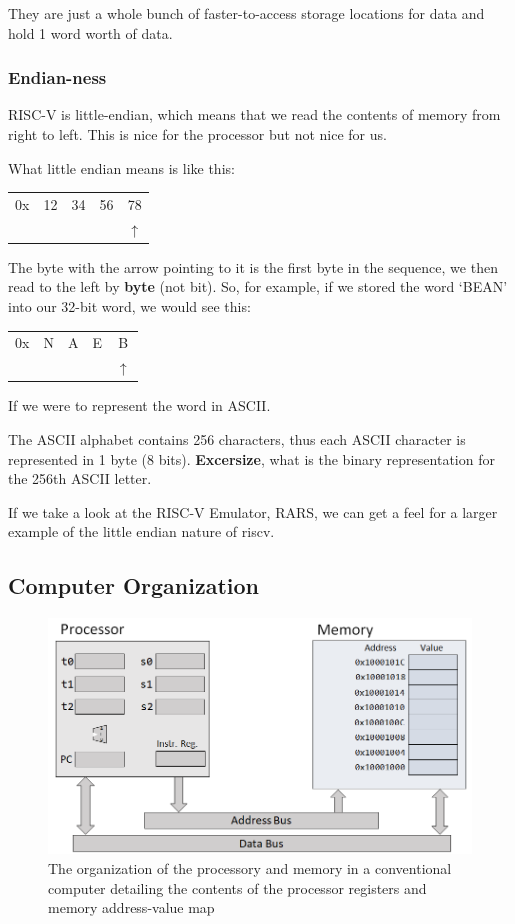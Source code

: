\documentclass{article}
\begin{document}
They are just a whole bunch of faster-to-access storage locations for data and hold 1 word worth of data. %
\subsubsection{Endian-ness}
RISC-V is little-endian, which means that we read the contents of memory from right to left. This is nice for the processor but not nice for us.

What little endian means is like this:
\begin{center}
	\begin{tabular}{ccccc}
		0x & 12 & 34 & 56 & 78\\
		&&&&$\uparrow$\\
	\end{tabular}
\end{center}
The byte with the arrow pointing to it is the first byte in the sequence, we then read to the left by \textbf{byte} (not bit). So, for example, if we stored the word `BEAN' into our 32-bit word, we would see this:
\begin{center}
\begin{tabular}{ccccc}
	0x & N & A & E & B\\
	&&&&$\uparrow$\\
\end{tabular}
\end{center}
If we were to represent the word in ASCII.
\begin{note}
	The ASCII alphabet contains 256 characters, thus each ASCII character is represented in 1 byte (8 bits). \textbf{Excersize}, what is the binary representation for the 256th ASCII letter. 
\end{note}
If we take a look at the RISC-V Emulator, RARS, we can get a feel for a larger example of the little endian nature of riscv. %

\subsection{Computer Organization}
\begin{figure}
	\begin{center}
		\includegraphics[scale=0.35]{cmporg.png}
	\end{center}
\caption[]{The organization of the processory and memory in a conventional computer detailing the contents of the processor registers and memory address-value map}
\label{fig:cmporg}
\end{figure}
\end{document}
